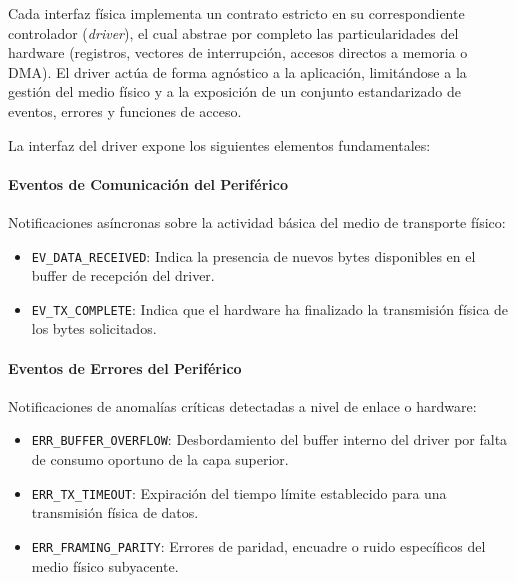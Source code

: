 Cada interfaz física implementa un contrato estricto en su correspondiente controlador (\textit{driver}), el cual abstrae por completo las particularidades del hardware (registros, vectores de interrupción, accesos directos a memoria o DMA). El driver actúa de forma agnóstico a la aplicación, limitándose a la gestión del medio físico y a la exposición de un conjunto estandarizado de eventos, errores y funciones de acceso.

La interfaz del driver expone los siguientes elementos fundamentales:

\paragraph{Eventos de Comunicación del Periférico} Notificaciones asíncronas sobre la actividad básica del medio de transporte físico:
\begin{itemize}
    \item \texttt{EV\_DATA\_RECEIVED}: Indica la presencia de nuevos bytes disponibles en el buffer de recepción del driver.
    \item \texttt{EV\_TX\_COMPLETE}: Indica que el hardware ha finalizado la transmisión física de los bytes solicitados.
\end{itemize}

\paragraph{Eventos de Errores del Periférico} Notificaciones de anomalías críticas detectadas a nivel de enlace o hardware:
\begin{itemize}
    \item \texttt{ERR\_BUFFER\_OVERFLOW}: Desbordamiento del buffer interno del driver por falta de consumo oportuno de la capa superior.
    \item \texttt{ERR\_TX\_TIMEOUT}: Expiración del tiempo límite establecido para una transmisión física de datos.
    \item \texttt{ERR\_FRAMING\_PARITY}: Errores de paridad, encuadre o ruido específicos del medio físico subyacente.
\end{itemize}

